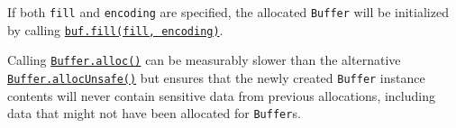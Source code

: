 If both \texttt{fill} and \texttt{encoding} are specified, the allocated
\texttt{Buffer} will be initialized by calling
\hyperref[buffillvalue-offset-end-encoding]{\texttt{buf.fill(fill,\ encoding)}}.

\begin{Shaded}
\begin{Highlighting}[]
\NormalTok{ \{ }\NormalTok{ \} } \OperatorTok{;}

\OperatorTok{=} \NormalTok{(}\OperatorTok{,} \OperatorTok{,} \NormalTok{)}\OperatorTok{;}

\OperatorTok{;}
\end{Highlighting}
\end{Shaded}

\begin{Shaded}
\begin{Highlighting}[]
\NormalTok{ \{ }\NormalTok{ \} }\OperatorTok{=} \NormalTok{(}\NormalTok{)}\OperatorTok{;}

\OperatorTok{=} \NormalTok{(}\OperatorTok{,} \OperatorTok{,} \NormalTok{)}\OperatorTok{;}

\OperatorTok{;}
\end{Highlighting}
\end{Shaded}

Calling
\hyperref[static-method-bufferallocsize-fill-encoding]{\texttt{Buffer.alloc()}}
can be measurably slower than the alternative
\hyperref[static-method-bufferallocunsafesize]{\texttt{Buffer.allocUnsafe()}}
but ensures that the newly created \texttt{Buffer} instance contents
will never contain sensitive data from previous allocations, including
data that might not have been allocated for \texttt{Buffer}s.

